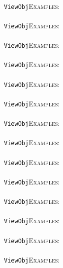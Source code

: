 \documentclass[a4paper,11pt]{report}
\begin{document}
{{ \\
 \texttt{ViewObj}{\nobreakspace}{\nobreakspace}{\nobreakspace}{\nobreakspace}\textsc{Examples:} \\
 \\
 \texttt{ViewObj}{\nobreakspace}{\nobreakspace}{\nobreakspace}{\nobreakspace}\textsc{Examples:} \\
 \\
 \texttt{ViewObj}{\nobreakspace}{\nobreakspace}{\nobreakspace}{\nobreakspace}\textsc{Examples:} \\
 \\
 \texttt{ViewObj}{\nobreakspace}{\nobreakspace}{\nobreakspace}{\nobreakspace}\textsc{Examples:} \\
 \\
 \texttt{ViewObj}{\nobreakspace}{\nobreakspace}{\nobreakspace}{\nobreakspace}\textsc{Examples:} \\
 \\
 \texttt{ViewObj}{\nobreakspace}{\nobreakspace}{\nobreakspace}{\nobreakspace}\textsc{Examples:} \\
 \\
 \texttt{ViewObj}{\nobreakspace}{\nobreakspace}{\nobreakspace}{\nobreakspace}\textsc{Examples:} \\
 \\
 \texttt{ViewObj}{\nobreakspace}{\nobreakspace}{\nobreakspace}{\nobreakspace}\textsc{Examples:} \\
 \\
 \texttt{ViewObj}{\nobreakspace}{\nobreakspace}{\nobreakspace}{\nobreakspace}\textsc{Examples:} \\
 \\
 \texttt{ViewObj}{\nobreakspace}{\nobreakspace}{\nobreakspace}{\nobreakspace}\textsc{Examples:} \\
 \\
 \texttt{ViewObj}{\nobreakspace}{\nobreakspace}{\nobreakspace}{\nobreakspace}\textsc{Examples:} \\
 \\
 \texttt{ViewObj}{\nobreakspace}{\nobreakspace}{\nobreakspace}{\nobreakspace}\textsc{Examples:} \\
 \\
 \texttt{ViewObj}{\nobreakspace}{\nobreakspace}{\nobreakspace}{\nobreakspace}\textsc{Examples:} \\
 \\
 \texttt{ViewObj}{\nobreakspace}{\nobreakspace}{\nobreakspace}{\nobreakspace}\textsc{Examples:} \\
 \\
}}
\end{document}
